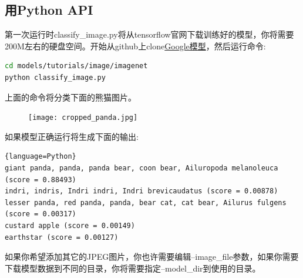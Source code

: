 \subsection{用Python API}
第一次运行时classify\_image.py将从tensorflow官网下载训练好的模型，你将需要200M左右的硬盘空间。开始从github上clone\href{https://github.com/tensorflow/models}{Google模型}，然后运行命令:
\begin{lstlisting}[language=Bash]
cd models/tutorials/image/imagenet
python classify_image.py
\end{lstlisting}
上面的命令将分类下面的熊猫图片。
\begin{center}
\begin{figure}[h]
\texttt{[image: cropped\_panda.jpg]}
\end{figure}
\end{center}
如果模型正确运行将生成下面的输出:
\begin{lstlisting}{language=Python}
giant panda, panda, panda bear, coon bear, Ailuropoda melanoleuca (score = 0.88493)
indri, indris, Indri indri, Indri brevicaudatus (score = 0.00878)
lesser panda, red panda, panda, bear cat, cat bear, Ailurus fulgens (score = 0.00317)
custard apple (score = 0.00149)
earthstar (score = 0.00127)
\end{lstlisting}
如果你希望添加其它的JPEG图片，你也许需要编辑--image\_file参数，如果你需要下载模型数据到不同的目录，你将需要指定--model\_dir到使用的目录。
